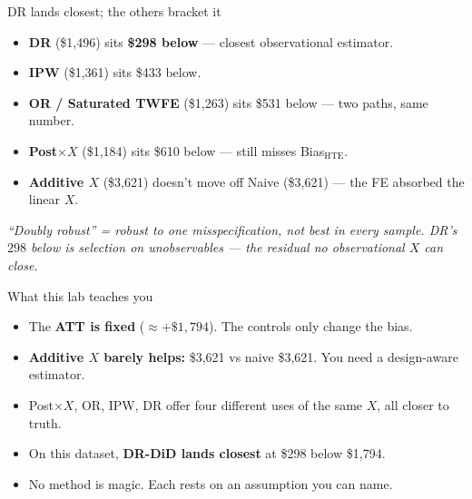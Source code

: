 \documentclass[11pt,aspectratio=169]{beamer}
\begin{document}
\begin{frame}{DR lands closest; the others bracket it}
\vspace{0.5em}
\begin{itemize}
  \item \textbf{DR} (\$1{,}496) sits \textbf{\$298 below} --- closest observational estimator.
  \item \textbf{IPW} (\$1{,}361) sits \$433 below.
  \item \textbf{OR / Saturated TWFE} (\$1{,}263) sits \$531 below --- two paths, same number.
  \item \textbf{Post${\times}X$} (\$1{,}184) sits \$610 below --- still misses Bias$_\text{HTE}$.
  \item \textbf{Additive $X$} (\$3{,}621) doesn't move off Naive (\$3{,}621) --- the FE absorbed the linear $X$.
\end{itemize}
\vspace{0.4em}
\begin{center}
\small\color{warmgray}\itshape
``Doubly robust'' = robust to one misspecification, not best in every sample. \;DR's $298$ below is selection on unobservables --- the residual no observational $X$ can close.
\end{center}
\end{frame}

\begin{frame}{What this lab teaches you}
\vspace{0.8em}
\begin{itemize}
  \item The \textbf{ATT is fixed} ($\approx +\$1{,}794$). \;The controls only change the bias.
  \item \textbf{Additive $X$ barely helps:} \$3{,}621 vs naive \$3{,}621. \;You need a design-aware estimator.
  \item Post${\times}X$, OR, IPW, DR offer four different uses of the same $X$, all closer to truth.
  \item On this dataset, \textbf{DR-DiD lands closest} at \$298 below \$1{,}794.
  \item No method is magic. Each rests on an assumption you can name.
\end{itemize}
\end{frame}

\end{document}
